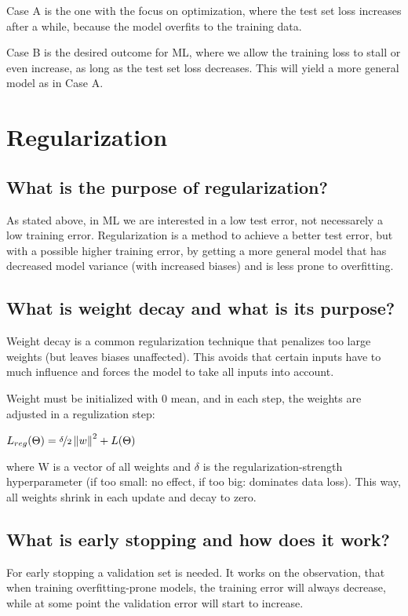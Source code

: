 Case A is the one with the focus on optimization, where the test set loss increases after a while, because the model overfits to the training data.

Case B is the desired outcome for ML, where we allow the training loss to stall or even increase, as long as the test set loss decreases. This will yield a more general model as in Case A.

\section{Regularization}
\subsection{What is the purpose of regularization?}

As stated above, in ML we are interested in a low test error, not necessarely a low training error. Regularization is a method to achieve a better test error, but with a possible higher training error, by getting a more general model that has decreased model variance (with increased biases) and is less prone to overfitting. 

\subsection{What is weight decay and what is its purpose?}
Weight decay is a common regularization technique that penalizes too large weights (but leaves biases unaffected). This avoids that certain inputs have to much influence and forces the model to take all inputs into account. 

Weight must be initialized with 0 mean, and in each step, the weights are adjusted in a regulization step:

$L_{reg}(\Theta) = \nicefrac{\delta}{2}\left\lVert w\right\rVert^2 + L(\Theta)$

where W is a vector of all weights and $\delta$ is the regularization-strength hyperparameter (if too small: no effect, if too big: dominates data loss).
This way, all weights shrink in each update and decay to zero.  

\subsection{What is early stopping and how does it work?}
For early stopping a validation set is needed. It works on the observation, that when training overfitting-prone models, the training error will always decrease, while at some point the validation error will start to increase. 

